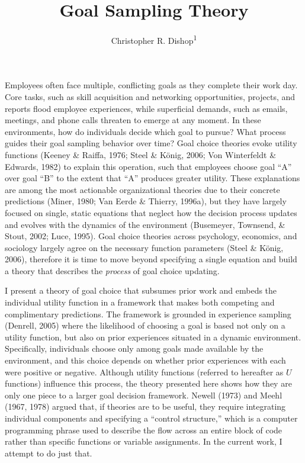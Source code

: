 \documentclass[english,,man]{apa6}
\title{Goal Sampling Theory}
\author{Christopher R. Dishop\textsuperscript{1}}
\date{}
\affiliation{
\vspace{0.5cm}
\textsuperscript{1} Michigan State University}
\theoremstyle{definition}
\theoremstyle{definition}
\theoremstyle{definition}
\theoremstyle{remark}
\begin{document}
\maketitle

Employees often face multiple, conflicting goals as they complete their
work day. Core tasks, such as skill acquisition and networking
opportunities, projects, and reports flood employee experiences, while
superficial demands, such as emails, meetings, and phone calls threaten
to emerge at any moment. In these environments, how do individuals
decide which goal to pursue? What process guides their goal sampling
behavior over time? Goal choice theories evoke utility functions (Keeney
\& Raiffa, 1976; Steel \& König, 2006; Von Winterfeldt \& Edwards, 1982)
to explain this operation, such that employees choose goal \enquote{A}
over goal \enquote{B} to the extent that \enquote{A} produces greater
utility. These explanations are among the most actionable organizational
theories due to their concrete predictions (Miner, 1980; Van Eerde \&
Thierry, 1996a), but they have largely focused on single, static
equations that neglect how the decision process updates and evolves with
the dynamics of the environment (Busemeyer, Townsend, \& Stout, 2002;
Luce, 1995). Goal choice theories across psychology, economics, and
sociology largely agree on the necessary function parameters (Steel \&
König, 2006), therefore it is time to move beyond specifying a single
equation and build a theory that describes the \emph{process} of goal
choice updating.

I present a theory of goal choice that subsumes prior work and embeds
the individual utility function in a framework that makes both competing
and complimentary predictions. The framework is grounded in experience
sampling (Denrell, 2005) where the likelihood of choosing a goal is
based not only on a utility function, but also on prior experiences
situated in a dynamic environment. Specifically, individuals choose only
among goals made available by the environment, and this choice depends
on whether prior experiences with each were positive or negative.
Although utility functions (referred to hereafter as \(U\) functions)
influence this process, the theory presented here shows how they are
only one piece to a larger goal decision framework. Newell (1973) and
Meehl (1967, 1978) argued that, if theories are to be useful, they
require integrating individual components and specifying a
\enquote{control structure,} which is a computer programming phrase used
to describe the flow across an entire block of code rather than specific
functions or variable assignments. In the current work, I attempt to do
just that.
\end{document}
